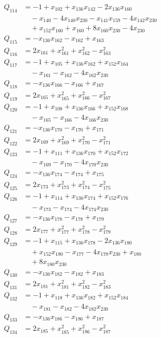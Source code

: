 \begin{align*}
Q_{114}&=-1+x_{102}+x_{136}x_{142}-2x_{136}x_{160}\\
&\quad -x_{140}-4x_{140}x_{230}-x_{141}x_{159}-4x_{142}x_{230}\\
&\quad +x_{152}x_{160}+x_{160}+8x_{160}x_{230}-4x_{230}\\
Q_{115}&=-x_{136}x_{162}-x_{162}+x_{163}\\
Q_{116}&=2x_{161}+x_{161}^{2}+x_{162}^{2}-x_{163}^{2}\\
Q_{117}&=-1+x_{105}+x_{136}x_{162}+x_{152}x_{164}\\
&\quad -x_{161}-x_{162}-4x_{162}x_{230}\\
Q_{118}&=-x_{136}x_{166}-x_{166}+x_{167}\\
Q_{119}&=2x_{165}+x_{165}^{2}+x_{166}^{2}-x_{167}^{2}\\
Q_{120}&=-1+x_{108}+x_{136}x_{166}+x_{152}x_{168}\\
&\quad -x_{165}-x_{166}-4x_{166}x_{230}\\
Q_{121}&=-x_{136}x_{170}-x_{170}+x_{171}\\
Q_{122}&=2x_{169}+x_{169}^{2}+x_{170}^{2}-x_{171}^{2}\\
Q_{123}&=-1+x_{111}+x_{136}x_{170}+x_{152}x_{172}\\
&\quad -x_{169}-x_{170}-4x_{170}x_{230}\\
Q_{124}&=-x_{136}x_{174}-x_{174}+x_{175}\\
Q_{125}&=2x_{173}+x_{173}^{2}+x_{174}^{2}-x_{175}^{2}\\
Q_{126}&=-1+x_{114}+x_{136}x_{174}+x_{152}x_{176}\\
&\quad -x_{173}-x_{174}-4x_{174}x_{230}\\
Q_{127}&=-x_{136}x_{178}-x_{178}+x_{179}\\
Q_{128}&=2x_{177}+x_{177}^{2}+x_{178}^{2}-x_{179}^{2}\\
Q_{129}&=-1+x_{115}+x_{136}x_{178}-2x_{136}x_{180}\\
&\quad +x_{152}x_{180}-x_{177}-4x_{178}x_{230}+x_{180}\\
&\quad +8x_{180}x_{230}\\
Q_{130}&=-x_{136}x_{182}-x_{182}+x_{183}\\
Q_{131}&=2x_{181}+x_{181}^{2}+x_{182}^{2}-x_{183}^{2}\\
Q_{132}&=-1+x_{118}+x_{136}x_{182}+x_{152}x_{184}\\
&\quad -x_{181}-x_{182}-4x_{182}x_{230}\\
Q_{133}&=-x_{136}x_{186}-x_{186}+x_{187}\\
Q_{134}&=2x_{185}+x_{185}^{2}+x_{186}^{2}-x_{187}^{2}\\

\end{align*}
